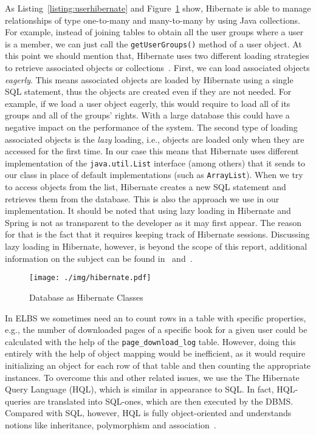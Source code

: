 As Listing~\ref{listing:userhibernate} and Figure~\ref{fig:pojos} show, Hibernate 
is able to manage relationships of type one-to-many and many-to-many by using Java collections. 
For example, instead of joining tables to obtain all the user groups where a user is a member, we can just
call the \verb=getUserGroups()= method of a user object. At this point we should mention that, Hibernate
uses two different loading strategies to retrieve associated objects or collections~\cite{whibernate1}. 
First, we can load associated objects \emph{eagerly}. This means associated
objects are loaded by Hibernate using a single SQL statement, thus
the objects are created even if they are not needed. For example, if we load a user object eagerly, this would 
require to load all of its groups and all of the groups' rights. With a large database this could have a
negative impact on the performance of the system. The second type of loading associated objects is
the \emph{lazy} loading, i.e., objects are loaded only when they are accessed for the first time.
In our case this means that Hibernate uses different implementation of the \verb=java.util.List=
interface (among others) that it sends to our class in place of default implementations (such as \verb=ArrayList=). 
When we try to access objects from the list, Hibernate creates a new SQL statement and retrieves them from
the database. This is also the approach we use in our implementation. It should be noted that using lazy loading 
in Hibernate
and Spring is not as transparent to the developer as it may first appear. The reason for that is the fact that it requires keeping track of Hibernate
sessions. Discussing lazy loading in Hibernate, however, is beyond the scope of
this report, additional information on the subject can be found in~\cite{whibernate1} and~\cite{whibernate2}.\newline

\begin{figure}[htp]
	\begin{center}
		\texttt{[image: ./img/hibernate.pdf]}
		\caption{Database as Hibernate Classes}
		\label{fig:pojos}
	\end{center}
\end{figure}

In ELBS we sometimes need an to count rows in a table with specific properties, e.g., the number of downloaded pages of a specific book
for a given user could be calculated with the help of the \verb=page_download_log= table. However, doing this entirely with the help of object mapping would be inefficient, as it would require initializing an object for each row of that table and then counting the appropriate instances. To overcome this and other related issues, we use the The Hibernate Query Language (HQL), which is similar in appearance to SQL. In fact, HQL-queries are translated into SQL-ones, which are then executed by the DBMS.    
Compared with SQL, however, HQL is fully object-oriented and understands notions like inheritance, polymorphism and association~\cite{whibernate3}.

